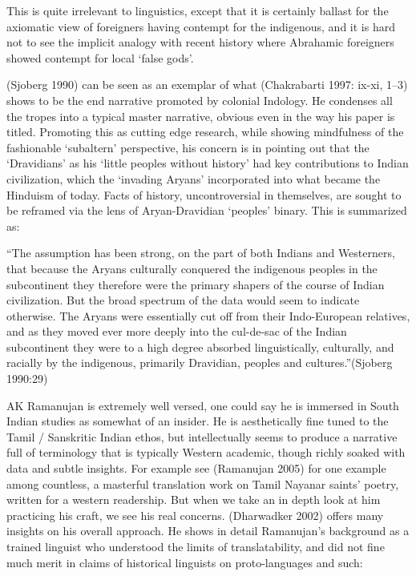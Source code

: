 This is quite irrelevant to linguistics, except that it is certainly ballast for the axiomatic view of foreigners having contempt for the indigenous, and it is hard not to see the implicit analogy with recent history where Abrahamic foreigners showed contempt for local ‘false gods’.

(Sjoberg 1990) can be seen as an exemplar of what (Chakrabarti 1997: ix-xi, 1–3) shows to be the end narrative promoted by colonial Indology. He condenses all the tropes into a typical master narrative, obvious even in the way his paper is titled. Promoting this as cutting edge research, while showing mindfulness of the fashionable ‘subaltern’ perspective, his concern is in pointing out that the ‘Dravidians’ as his ‘little peoples without history’ had key contributions to Indian civilization, which the ‘invading Aryans’ incorporated into what became the Hinduism of today. Facts of history, uncontroversial in themselves, are sought to be reframed via the lens of Aryan-Dravidian ‘peoples’ binary. This is summarized as:

\begin{myquote}
“The assumption has been strong, on the part of both Indians and Westerners, that because the Aryans culturally conquered the indigenous peoples in the subcontinent they therefore were the primary shapers of the course of Indian civilization. But the broad spectrum of the data would seem to indicate otherwise. The Aryans were essentially cut off from their Indo-European relatives, and as they moved ever more deeply into the cul-de-sac of the Indian subcontinent they were to a high degree absorbed linguistically, culturally, and racially by the indigenous, primarily Dravidian, peoples and cultures.”\hfill (Sjoberg 1990:29)
\end{myquote}

AK Ramanujan is extremely well versed, one could say he is immersed in South Indian studies as somewhat of an insider. He is aesthetically fine tuned to the Tamil / Sanskritic Indian ethos, but intellectually seems to produce a narrative full of terminology that is typically Western academic, though richly soaked with data and subtle insights. For example see (Ramanujan 2005) for one example among countless, a masterful translation work on Tamil Nayanar saints’ poetry, written for a western readership. But when we take an in depth look at him practicing his craft, we see his real concerns. (Dharwadker 2002) offers many insights on his overall approach. He shows in detail Ramanujan’s background as a trained linguist who understood the limits of translatability, and did not fine much merit in claims of historical linguists on proto-languages and such:

